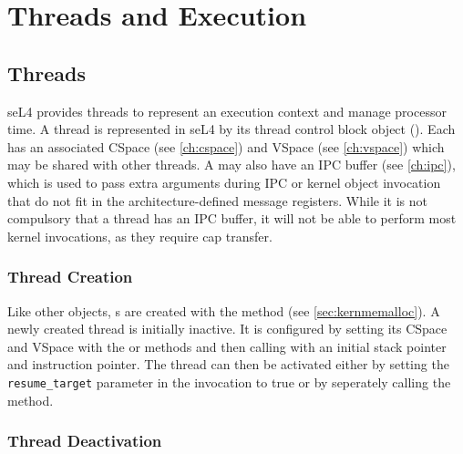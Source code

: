 %
%
%
%

\chapter{\label{ch:threads}Threads and Execution}

\section{Threads}
\label{sec:threads}

seL4 provides threads to represent an execution context and manage
processor time. A thread is represented in seL4 by its thread control block
object (). Each  has an associated CSpace (see
\autoref{ch:cspace}) and VSpace (see \autoref{ch:vspace}) which
may be shared with other threads. A  may also have an IPC buffer
(see  \autoref{ch:ipc}), which is used to pass extra arguments during IPC
or kernel object invocation that do not fit in the architecture-defined message
registers. While it is not compulsory that a thread has an IPC buffer,
it will not be able to perform most kernel invocations, as they require
cap transfer.

\subsection{Thread Creation}

Like other objects, s are created with the
 method (see
\autoref{sec:kernmemalloc}). A newly created thread is initially inactive. It
is configured by setting its CSpace and VSpace with the
or  methods and then calling
 with an initial stack pointer and instruction
pointer. The thread can then be activated either by setting the
\texttt{resume\_target} parameter in the  invocation to true
or by seperately calling the  method.

\subsection{Thread Deactivation}
\label{sec:thread_deactivation}

